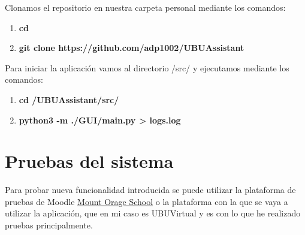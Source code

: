 Clonamos el repositorio en nuestra carpeta personal mediante los comandos:
\begin{enumerate}
	\item \textbf{cd \detokenize{~}}
	\item \textbf{git clone https://github.com/adp1002/UBUAssistant}
\end{enumerate}

Para iniciar la aplicación vamos al directorio /src/ y ejecutamos mediante los comandos:
\begin{enumerate}
	\item \textbf{cd \detokenize{~}/UBUAssistant/src/}
	\item \textbf{python3 -m ./GUI/main.py \detokenize{>}> logs.log}
\end{enumerate}

\section{Pruebas del sistema}

Para probar nueva funcionalidad introducida se puede utilizar la plataforma de pruebas de Moodle \href{https://school.moodledemo.net/}{Mount Orage School} o la plataforma con la que se vaya a utilizar la aplicación, que en mi caso es UBUVirtual y es con lo que he realizado pruebas principalmente.